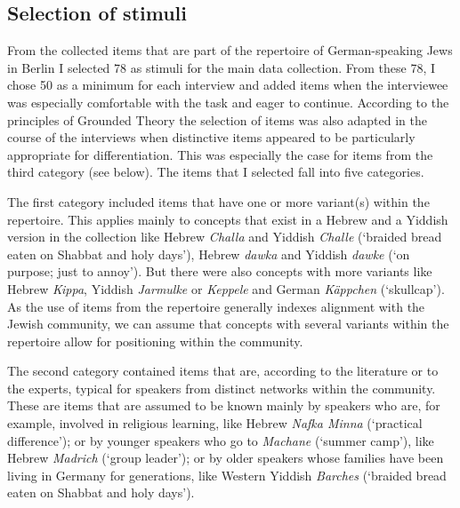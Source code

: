 \documentclass[output=paper]{langscibook}
\begin{document}
\subsection{Selection of stimuli}

From the collected items that are part of the repertoire of German-speaking Jews in Berlin I selected 78 as stimuli for the main data collection. From these 78, I chose 50 as a minimum for each interview and added items when the interviewee was especially comfortable with the task and eager to continue. According to the principles of Grounded Theory the selection of items was also adapted in the course of the interviews when distinctive items appeared to be particularly appropriate for differentiation. This was especially the case for items from the third category (see below). The items that I selected fall into five categories.

The first category included items that have one or more variant(s) within the repertoire. This applies mainly to concepts that exist in a Hebrew and a Yiddish version in the collection like Hebrew \textit{Challa} and Yiddish \textit{Challe} (‘braided bread eaten on Shabbat and holy days’), Hebrew \textit{dawka} and Yiddish \textit{dawke} (‘on purpose; just to annoy’). But there were also concepts with more variants like Hebrew \textit{Kippa}, Yiddish \textit{Jarmulke} or \textit{Keppele} and German \textit{Käppchen} (‘skullcap’). As the use of items from the repertoire generally indexes alignment with the Jewish community, we can assume that concepts with several variants within the repertoire allow for positioning within the community.

The second category contained items that are, according to the literature or to the experts, typical for speakers from distinct networks within the community. These are items that are assumed to be known mainly by speakers who are, for example, involved in religious learning, like Hebrew \textit{Nafka Minna} (‘practical difference’); or by younger speakers who go to \textit{Machane} (‘summer camp’), like Hebrew \textit{Madrich} (‘group leader’); or by older speakers whose families have been living in Germany for generations, like Western Yiddish \textit{Barches} (‘braided bread eaten on Shabbat and holy days’).
\end{document}

